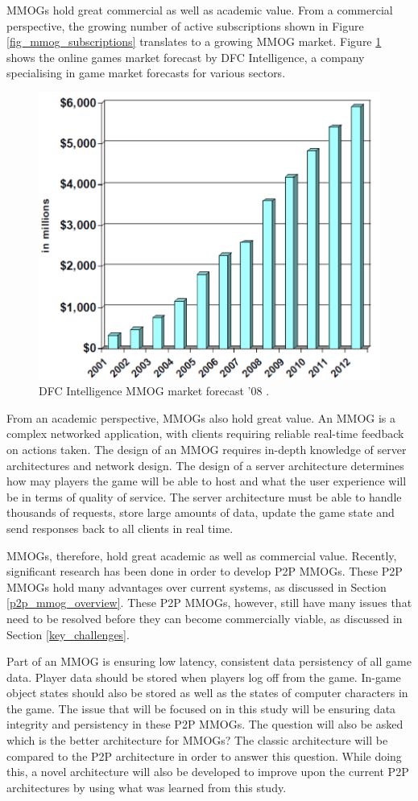 \documentclass[journal,oneside,a4paper,onecolumn]{IEEEtran}
\begin{document}
\acp{MMOG} hold great commercial as well as academic value. From a commercial perspective, the growing number of active subscriptions shown in Figure \ref{fig_mmog_subscriptions} translates to a growing \ac{MMOG} market. Figure \ref{fig_mmog_market} shows the online games market forecast by DFC Intelligence, a company specialising in game market forecasts for various sectors.
%
\begin{figure}[htbp]
 \centering
 \includegraphics[width=0.4\columnwidth]{DFC_MMOG_market}
 \caption{DFC Intelligence MMOG market forecast '08 \cite{Fan_phd}.}
 \label{fig_mmog_market}
\end{figure}

From an academic perspective, \acp{MMOG} also hold great value. An MMOG is a complex networked application, with clients requiring reliable real-time feedback on actions taken. The design of an MMOG requires in-depth knowledge of server architectures and network design. The design of a server architecture determines how may players the game will be able to host and what the user experience will be in terms of quality of service. The server architecture must be able to handle thousands of requests, store large amounts of data, update the game state and send responses back to all clients in real time.

MMOGs, therefore, hold great academic as well as commercial value. Recently, significant research has been done in order to develop \ac{P2P} MMOGs. These P2P MMOGs hold many advantages over current systems, as discussed in Section \ref{p2p_mmog_overview}. These \ac{P2P} MMOGs, however, still have many issues that need to be resolved before they can become commercially viable, as discussed in Section \ref{key_challenges}.

Part of an MMOG is ensuring low latency, consistent data persistency of all game data. Player data should be stored when players log off from the game. In-game object states should also be stored as well as the states of computer characters in the game. The issue that will be focused on in this study will be ensuring data integrity and persistency in these P2P MMOGs. The question will also be asked which is the better architecture for MMOGs? The classic architecture will be compared to the P2P architecture in order to answer this question. While doing this, a novel architecture will also be developed to improve upon the current P2P architectures by using what was learned from this study.
\end{document}
